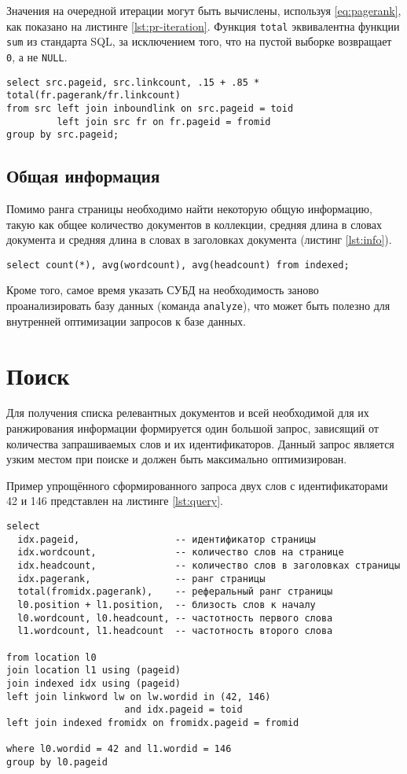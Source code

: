 Значения на очередной итерации могут быть вычислены, используя \ref{eq:pagerank}, как показано на листинге \ref{lst:pr-iteration}. Функция \verb|total| эквивалентна функции \verb|sum| из стандарта SQL, за исключением того, что на пустой выборке возвращает \verb|0|, а не \verb|NULL|.
\begin{lstlisting}[language=sqlite, caption=Итерация процесса вычисления PageRank., label=lst:pr-iteration]
select src.pageid, src.linkcount, .15 + .85 * total(fr.pagerank/fr.linkcount)
from src left join inboundlink on src.pageid = toid
         left join src fr on fr.pageid = fromid
group by src.pageid;
\end{lstlisting}


\subsection{Общая информация}
Помимо ранга страницы необходимо найти некоторую общую информацию, такую как общее количество документов в коллекции, средняя длина в словах документа и средняя длина в словах в заголовках документа (листинг \ref{lst:info}).
\begin{lstlisting}[language=sqlite, caption=Нахождение общей информации., label=lst:info]
select count(*), avg(wordcount), avg(headcount) from indexed;
\end{lstlisting}

Кроме того, самое время указать СУБД на необходимость заново проанализировать базу данных (команда \verb|analyze|), что может быть полезно для внутренней оптимизации запросов к базе данных.


\section{Поиск}
Для получения списка релевантных документов и всей необходимой для их ранжирования информации формируется один большой запрос, зависящий от количества запрашиваемых слов и их идентификаторов. Данный запрос является узким местом при поиске и должен быть максимально оптимизирован.

Пример упрощённого сформированного запроса двух слов с идентификаторами 42 и 146 представлен на листинге \ref{lst:query}.
\begin{lstlisting}[language=sqlite, caption=Запрос релевантных документов., label=lst:query]
select
  idx.pageid,                 -- идентификатор страницы
  idx.wordcount,              -- количество слов на странице
  idx.headcount,              -- количество слов в заголовках страницы
  idx.pagerank,               -- ранг страницы
  total(fromidx.pagerank),    -- реферальный ранг страницы
  l0.position + l1.position,  -- близость слов к началу
  l0.wordcount, l0.headcount, -- частотность первого слова
  l1.wordcount, l1.headcount  -- частотность второго слова

from location l0
join location l1 using (pageid)
join indexed idx using (pageid)
left join linkword lw on lw.wordid in (42, 146)
                     and idx.pageid = toid
left join indexed fromidx on fromidx.pageid = fromid

where l0.wordid = 42 and l1.wordid = 146
group by l0.pageid
\end{lstlisting}

